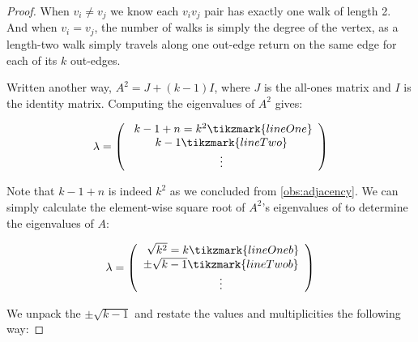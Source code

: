 \documentclass{article}
\begin{document}
\begin{proof}
When $v_i \neq v_j$ we know each $v_iv_j$ pair has exactly one walk of length 2. And when $v_i = v_j$, the number of walks is simply the degree of the vertex, as a length-two walk simply travels along one out-edge return on the same edge for each of its $k$ out-edges.

Written another way, $A^2 = J + (k - 1)I$, where $J$ is the all-ones matrix and $I$ is the identity matrix. 
Computing the eigenvalues of $A^2$ gives:


\[ \lambda = 
    \left (
        \begin{array}{c}
            \
            k - 1 + n = k^2 \tikzmark{lineOne} \\
            k - 1 \tikzmark{lineTwo}\\
            \vdots \\
        \end{array}
    \right )
\]


Note that $k - 1 + n$ is indeed $k^2$ as we concluded from \ref{obs:adjacency}. We can simply calculate the element-wise square root of $A^2$'s eigenvalues of to determine the eigenvalues of $A$:

\[ \lambda = 
    \left (
        \begin{array}{c}
            \
            \sqrt{k^2} = k \tikzmark{lineOneb} \\
            \pm \sqrt{k - 1} \tikzmark{lineTwob}\\
            \vdots \\
        \end{array}
    \right )
\]


We unpack the $\pm \sqrt{k-1}$ and restate the values and multiplicities the following way:


\end{proof}
\end{document}
